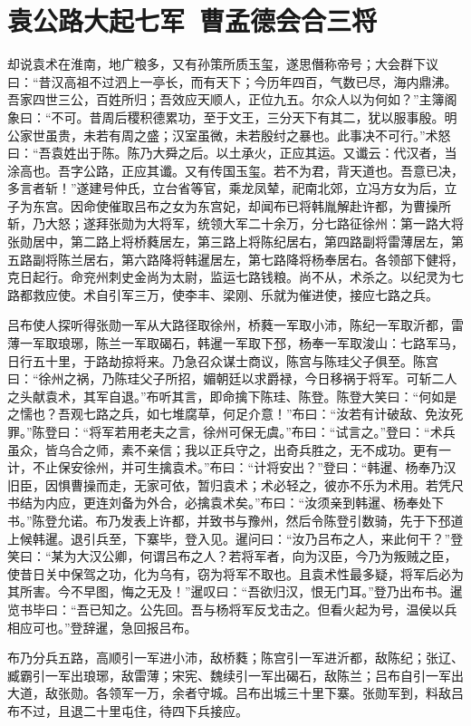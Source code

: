 \chapter{袁公路大起七军~曹孟德会合三将}

却说袁术在淮南，地广粮多，又有孙策所质玉玺，遂思僭称帝号；大会群下议曰：“昔汉高祖不过泗上一亭长，而有天下；今历年四百，气数已尽，海内鼎沸。吾家四世三公，百姓所归；吾效应天顺人，正位九五。尔众人以为何如？”主簿阁象曰：“不可。昔周后稷积德累功，至于文王，三分天下有其二，犹以服事殷。明公家世虽贵，未若有周之盛；汉室虽微，未若殷纣之暴也。此事决不可行。”术怒曰：“吾袁姓出于陈。陈乃大舜之后。以土承火，正应其运。又谶云：代汉者，当涂高也。吾字公路，正应其谶。又有传国玉玺。若不为君，背天道也。吾意已决，多言者斩！”遂建号仲氏，立台省等官，乘龙凤辇，祀南北郊，立冯方女为后，立子为东宫。因命使催取吕布之女为东宫妃，却闻布已将韩胤解赴许都，为曹操所斩，乃大怒；遂拜张勋为大将军，统领大军二十余万，分七路征徐州：第一路大将张勋居中，第二路上将桥蕤居左，第三路上将陈纪居右，第四路副将雷薄居左，第五路副将陈兰居右，第六路降将韩暹居左，第七路降将杨奉居右。各领部下健将，克日起行。命兖州刺史金尚为太尉，监运七路钱粮。尚不从，术杀之。以纪灵为七路都救应使。术自引军三万，使李丰、梁刚、乐就为催进使，接应七路之兵。

吕布使人探听得张勋一军从大路径取徐州，桥蕤一军取小沛，陈纪一军取沂都，雷薄一军取琅琊，陈兰一军取碣石，韩暹一军取下邳，杨奉一军取浚山：七路军马，日行五十里，于路劫掠将来。乃急召众谋士商议，陈宫与陈珪父子俱至。陈宫曰：“徐州之祸，乃陈珪父子所招，媚朝廷以求爵禄，今日移祸于将军。可斩二人之头献袁术，其军自退。”布听其言，即命擒下陈珪、陈登。陈登大笑曰：“何如是之懦也？吾观七路之兵，如七堆腐草，何足介意！”布曰：“汝若有计破敌、免汝死罪。”陈登曰：“将军若用老夫之言，徐州可保无虞。”布曰：“试言之。”登曰：“术兵虽众，皆乌合之师，素不亲信；我以正兵守之，出奇兵胜之，无不成功。更有一计，不止保安徐州，并可生擒袁术。”布曰：“计将安出？”登曰：“韩暹、杨奉乃汉旧臣，因惧曹操而走，无家可依，暂归袁术；术必轻之，彼亦不乐为术用。若凭尺书结为内应，更连刘备为外合，必擒袁术矣。”布曰：“汝须亲到韩暹、杨奉处下书。”陈登允诺。布乃发表上许都，并致书与豫州，然后令陈登引数骑，先于下邳道上候韩暹。退引兵至，下寨毕，登入见。暹问曰：“汝乃吕布之人，来此何干？”登笑曰：“某为大汉公卿，何谓吕布之人？若将军者，向为汉臣，今乃为叛贼之臣，使昔日关中保驾之功，化为乌有，窃为将军不取也。且袁术性最多疑，将军后必为其所害。今不早图，悔之无及！”暹叹曰：“吾欲归汉，恨无门耳。”登乃出布书。暹览书毕曰：“吾已知之。公先回。吾与杨将军反戈击之。但看火起为号，温侯以兵相应可也。”登辞暹，急回报吕布。

布乃分兵五路，高顺引一军进小沛，敌桥蕤；陈宫引一军进沂都，敌陈纪；张辽、臧霸引一军出琅琊，敌雷薄；宋宪、魏续引一军出碣石，敌陈兰；吕布自引一军出大道，敌张勋。各领军一万，余者守城。吕布出城三十里下寨。张勋军到，料敌吕布不过，且退二十里屯住，待四下兵接应。

